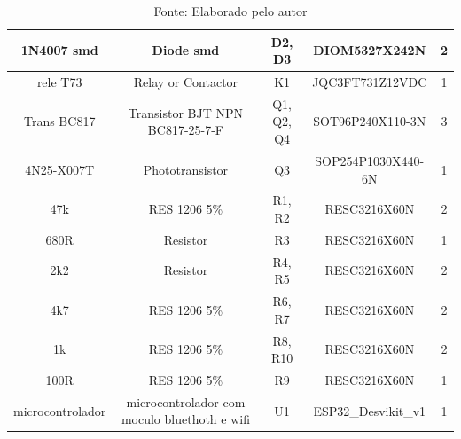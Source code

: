 \documentclass[../poliXuniversity_hospital_-USP-report.tex]{subfiles}
\begin{document}
\begin{table}[!ht]
\begin{adjustbox}{width=\columnwidth,center}
\begin{tabular}{|c|c|c|c|c|}
1N4007 smd       & Diode smd                                      & D2, D3                                                               & DIOM5327X242N       & 2        \\ \hline
rele T73         & Relay or Contactor                             & K1                                                                   & JQC3FT731Z12VDC     & 1        \\ \hline
Trans BC817      & Transistor BJT NPN   BC817-25-7-F              & Q1, Q2, Q4                                                           & SOT96P240X110-3N    & 3        \\ \hline
4N25-X007T       & Phototransistor                                & Q3                                                                   & SOP254P1030X440-6N  & 1        \\ \hline
47k              & RES 1206 5\%                                   & R1, R2                                                               & RESC3216X60N        & 2        \\ \hline
680R             & Resistor                                       & R3                                                                   & RESC3216X60N        & 1        \\ \hline
2k2              & Resistor                                       & R4, R5                                                               & RESC3216X60N        & 2        \\ \hline
4k7              & RES 1206 5\%                                   & R6, R7                                                               & RESC3216X60N        & 2        \\ \hline
1k               & RES 1206 5\%                                   & R8, R10                                                              & RESC3216X60N        & 2        \\ \hline
100R             & RES 1206 5\%                                   & R9                                                                   & RESC3216X60N        & 1        \\ \hline
microcontrolador & microcontrolador com   moculo bluethoth e wifi & U1                                                                   & ESP32\_Desvikit\_v1 & 1        \\ \hline

\end{tabular}
\end{adjustbox}
\centering
\caption*{Fonte: Elaborado pelo autor}
\label{table:Componentes Utilizados na placa de Interface com Usuário}
\end{table}
\end{document}
